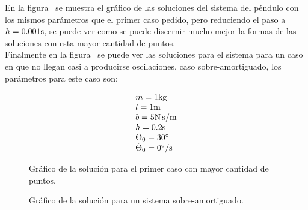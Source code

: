 
En la figura~ se muestra el gráfico de las soluciones del sistema del péndulo con los mismos parámetros que el primer caso pedido, pero reduciendo el paso a $h = 0.001 \si[per-mode=symbol]{\second}$, se puede ver como se puede discernir mucho mejor la formas de las soluciones con esta mayor cantidad de puntos.\\
Finalmente en la figura~ se puede ver las soluciones para el sistema para un caso en que no llegan casi a producirse oscilaciones, caso sobre-amortiguado, los parámetros para este caso son: 

\begin{equation*}
                \begin{array}{ll}
                  m = 1 \si[per-mode=symbol]{\kilo\gram} \\
                  l = 1 \si[per-mode=symbol]{\meter} \\  
                  b = 5 \si[per-mode=symbol]{\newton\second\per\meter} \\ 
                  h = 0.2 \si[per-mode=symbol]{\second} \\   
                  \Theta_{0} = 30 \si[per-mode=symbol]{\degree} \\  
                  \dot{\Theta}_{0} = 0 \si[per-mode=symbol]{\degree\per\second} \\            
                \end{array}
\end{equation*}




\clearpage


\begin{figure}[H] %
\begin{center}
\caption{\label{fig:fig_res_3}\footnotesize{Gráfico de la solución para el primer caso con mayor cantidad de puntos.}}
\end{center}
\end{figure}

\clearpage


\begin{figure}[H] %
\begin{center}
\caption{\label{fig:fig_res_4}\footnotesize{Gráfico de la solución para un sistema sobre-amortiguado.}}
\end{center}
\end{figure}
